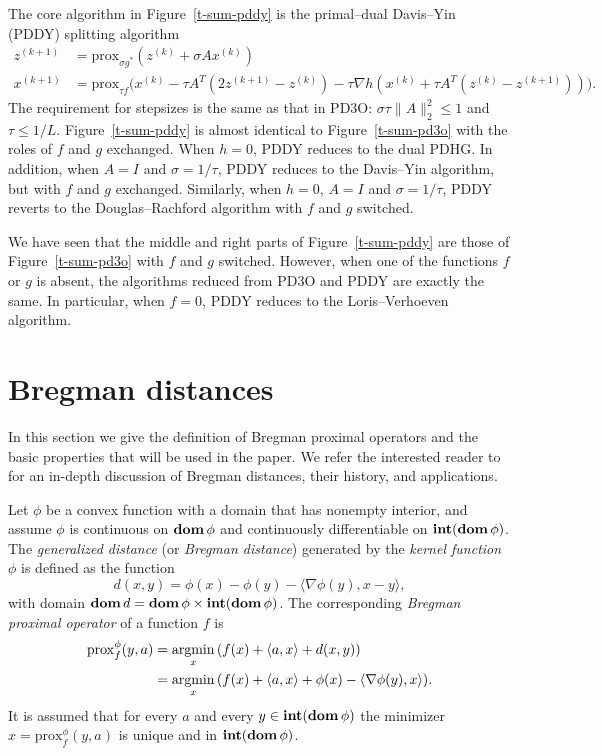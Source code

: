 \documentclass[letterpaper,11pt]{article}
\newcommand{\argmin}{\mathop{\rm argmin}}
\newcommand{\prox}{\mathrm{prox}}
\newcommand{\dom}{\mathop{\bf dom}}
\newcommand{\intr}{\mathop{\bf int}}
\newcommand{\inprod}[2]{\langle#1, #2\rangle}
\begin{document}
The core algorithm in Figure~\ref{t-sum-pddy} is the primal--dual
Davis--Yin (PDDY) splitting algorithm~\cite{SCMR20}%
\begin{subequations} \label{e-pddy}
\begin{align}
  z^{(k+1)} &= \prox_{\sigma g^\ast} (z^{(k)}+\sigma Ax^{(k)}) \\
  x^{(k+1)} &= \prox_{\tau f} \big(x^{(k)}-\tau A^T(2z^{(k+1)}-z^{(k)})
    -\tau \nabla h(x^{(k)}+\tau A^T(z^{(k)}-z^{(k+1)})) \big).
\end{align}
\end{subequations}
The requirement for stepsizes is the same as that in PD3O:
$\sigma \tau \|A\|_2^2 \leq 1$ and $\tau \leq 1/L$.
Figure~\ref{t-sum-pddy} is almost identical to Figure~\ref{t-sum-pd3o}
with the roles of $f$ and $g$ exchanged.
When $h=0$, PDDY reduces to the dual PDHG.
In addition, when $A=I$ and $\sigma=1/\tau$,
PDDY reduces to the Davis--Yin algorithm, but with $f$ and $g$ exchanged.
Similarly, when $h=0$, $A=I$ and $\sigma=1/\tau$,
PDDY reverts to the Douglas--Rachford algorithm with $f$ and $g$ switched.

We have seen that the middle and right parts of Figure~\ref{t-sum-pddy}
are those of Figure~\ref{t-sum-pd3o} with $f$ and $g$ switched.
However, when one of the functions $f$ or $g$ is absent,
the algorithms reduced from PD3O and PDDY are exactly the same.
In particular, when $f=0$, PDDY reduces to the Loris--Verhoeven algorithm.


\section{Bregman distances} \label{s-bregman}

In this section we give the definition of Bregman proximal operators and 
the basic properties that will be used in the paper.  
We refer the interested reader to~\cite{CeZ:97} 
for an in-depth discussion of Bregman distances, their history, and
applications.

Let $\phi$ be a convex function with a domain that has nonempty
interior, and assume $\phi$ is continuous on $\dom \phi$ and 
continuously differentiable on $\intr(\dom \phi)$.
The \emph{generalized distance} (or \emph{Bregman distance})
generated by the \emph{kernel function} $\phi$ is defined as the function
\[
d(x,y) = \phi(x)-\phi(y)-\inprod{\nabla \phi(y)}{x-y},
\]
with domain $\dom d=\dom \phi \times \intr(\dom \phi)$.
The corresponding \emph{Bregman proximal operator} of a function $f$ is 
\begin{align}
\prox_f^\phi(y,a)
  &= \argmin_x{(f(x)+\inprod{a}{x}+d(x,y))} \label{e-prox-opt} \\
&= \argmin_x{(f(x)+\inprod{a}{x}+\phi(x)
   -\inprod{\nabla \phi(y)}{x})}. \label{e-prox-opt2}
\end{align}
It is assumed that for every $a$ and every $y \in \intr(\dom\phi)$
the minimizer $\hat x=\prox_f^\phi(y,a)$ is unique and in
$\intr(\dom \phi)$.
\end{document}
